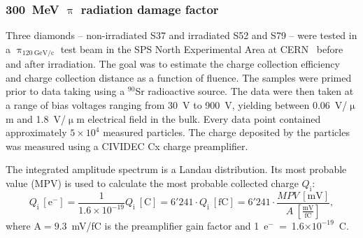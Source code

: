


\subsubsection{300~MeV $\uppi$ radiation damage factor}
Three diamonds -- non-irradiated S37 and irradiated S52 and S79 -- were tested in a $\uppi_\mathrm{120~GeV/c}$ test beam in the SPS North Experimental Area at CERN~\cite{Brianti:604383} before and after irradiation. The goal was to estimate the charge collection efficiency and charge collection distance as a function of fluence. The samples were primed prior to data taking using a $^{90}$Sr radioactive source. The data were then taken at a range of bias voltages ranging from 30~V to 900~V, yielding between 0.06~V/$\upmu$m and 1.8~V/$\upmu$m electrical field in the bulk. Every data point contained approximately $5\times10^4$ measured particles. The charge deposited by the particles was measured using a CIVIDEC Cx charge preamplifier. 

The integrated amplitude spectrum is a Landau distribution. Its most probable value (MPV) is used to calculate the most probable collected charge $Q_\mathrm{i}$:
\begin{equation}
\label{eq:ccdcalc}
Q_\mathrm{i}~[\mathrm{e}^-] 
= \frac{1} {1.6\times 10^{-19}} Q_\mathrm{i}~[\mathrm{C}] 
= 6'241 \cdot Q_\mathrm{i}~[\mathrm{fC}] 
= 6'241 \cdot \frac{MPV~[\mathrm{mV}]}{A~[\frac{\mathrm{mV}}{\mathrm{fC}}]}
,
\end{equation} 
where A$=9.3$~mV/fC is the preamplifier gain factor and 1~e$^-$~=~1.6$\times10^{-19}$~C. 

